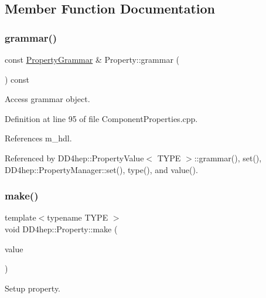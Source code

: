 \subsection{Member Function Documentation}
\hypertarget{class_d_d4hep_1_1_property_a2f865cd14e43b4f4ad8deaa5527d6fa1}{}\label{class_d_d4hep_1_1_property_a2f865cd14e43b4f4ad8deaa5527d6fa1} 
\subsubsection{\texorpdfstring{grammar()}{grammar()}}
{\footnotesize\ttfamily const \hyperlink{class_d_d4hep_1_1_property_grammar}{Property\+Grammar} \& Property\+::grammar (\begin{DoxyParamCaption}{ }\end{DoxyParamCaption}) const}



Access grammar object. 



Definition at line 95 of file Component\+Properties.\+cpp.



References m\+\_\+hdl.



Referenced by D\+D4hep\+::\+Property\+Value$<$ T\+Y\+P\+E $>$\+::grammar(), set(), D\+D4hep\+::\+Property\+Manager\+::set(), type(), and value().

\hypertarget{class_d_d4hep_1_1_property_a1b5ee0c9ca70c4960f7173b091ab0837}{}\label{class_d_d4hep_1_1_property_a1b5ee0c9ca70c4960f7173b091ab0837} 
\subsubsection{\texorpdfstring{make()}{make()}}
{\footnotesize\ttfamily template$<$typename T\+Y\+PE $>$ \\
void D\+D4hep\+::\+Property\+::make (\begin{DoxyParamCaption}\item[{T\+Y\+PE \&}]{value }\end{DoxyParamCaption})\hspace{0.3cm}{\ttfamily [protected]}}



Setup property. 




